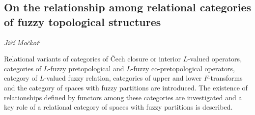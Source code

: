 \documentclass[../booklet.tex]{subfiles}
\begin{document}
\subsection[On the relationship among relational categories of fuzzy topological structures. {\it Jiří Močkoř}]{On the relationship among relational categories of fuzzy topological structures}

\begin{center}
  {\it Jiří Močkoř}
\end{center}



	Relational variants of categories of \v Cech closure or interior $L$-valued operators, categories of $L$-fuzzy pretopological and $L$-fuzzy co-pretopological operators, category of $L$-valued fuzzy relation, categories of upper and lower $F$-transforms and the category of spaces with fuzzy partitions are introduced. The existence of relationships defined by functors among these categories are investigated and a key role of a relational category of spaces with fuzzy partitions is described.

\end{document}
